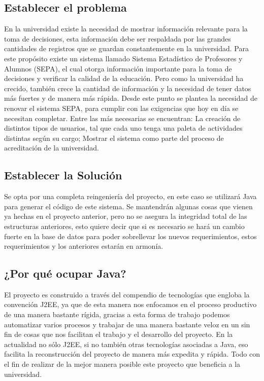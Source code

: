 \documentclass[a4paper,12pt,openany,oneside]{book}
\begin{document}
\subsection{Establecer el problema}
En la universidad existe la necesidad de mostrar información relevante para la toma de decisiones, esta información debe ser respaldada por las grandes cantidades de registros que se guardan constantemente en la universidad. Para este propósito existe un sistema llamado Sistema Estadístico de Profesores y Alumnos (SEPA), el cual otorga información importante para la toma de decisiones y verificar la calidad de la educación. Pero como la universidad ha crecido, también crece la cantidad de información y la necesidad de tener datos más fuertes y de manera más rápida. Desde este punto se plantea la necesidad de renovar el sistema SEPA, para cumplir con las exigencias que hoy en día se necesitan completar. Entre las más necesarias se encuentran: La creación de distintos tipos de usuarios, tal que cada uno tenga una paleta de actividades distintas según su cargo; Mostrar el sistema como parte del proceso de acreditación de la universidad.
\subsection{Establecer la Solución}
Se opta por una completa reingeniería del proyecto, en este caso se utilizará Java para generar el código de este sistema. Se mantendrán algunas cosas que vienen ya hechas en el proyecto anterior, pero no se asegura la integridad total de las estructuras anteriores, esto quiere decir que si es necesario se hará un cambio fuerte en la base de datos para poder sobrellevar los nuevos requerimientos, estos requerimientos y los anteriores estarán en armonía.
\subsection{¿Por qué ocupar Java?}
El proyecto es construido a través del compendio de tecnologías que engloba la convención J2EE, ya que de esta manera nos enfocamos en el proceso productivo de una manera bastante rígida, gracias a esta forma de trabajo podemos automatizar varios procesos y trabajar de una manera bastante veloz en un sin fin de cosas que nos facilitan el trabajo y el desarrollo del proyecto. En la actualidad no sólo J2EE, si no también otras tecnologías asociadas a Java, eso facilita la reconstrucción del proyecto de manera más expedita y rápida. Todo con el fin de realizar de la mejor manera posible este proyecto que beneficia a la universidad.
\end{document}
